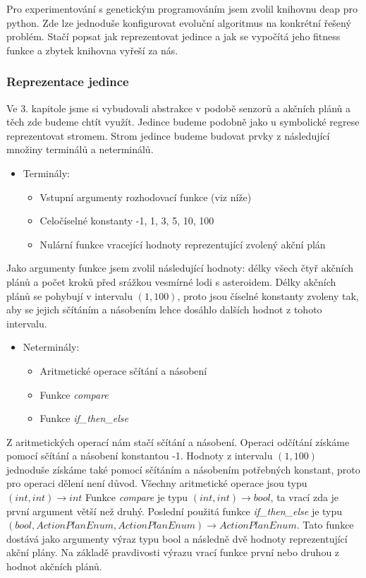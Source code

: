 Pro experimentování s genetickým programováním jsem zvolil knihovnu deap pro python. Zde lze jednoduše konfigurovat evoluční algoritmus na konkrétní řešený problém.
Stačí popsat jak reprezentovat jedince a jak se vypočítá jeho fitness funkce a zbytek knihovna vyřeší za nás.

\subsubsection{Reprezentace jedince}

Ve 3. kapitole jsme si vybudovali abstrakce v podobě senzorů a akčních plánů a těch zde budeme chtít využít.
Jedince budeme podobně jako u symbolické regrese reprezentovat stromem.
Strom jedince budeme budovat prvky z následující množiny terminálů a neterminálů.

\begin{itemize}
\item{
    Terminály:
    \begin{itemize}
        \item Vstupní argumenty rozhodovací funkce (viz níže)
        \item Celočíselné konstanty -1, 1, 3, 5, 10, 100
        \item Nulární funkce vracející hodnoty reprezentující zvolený akční plán  
    \end{itemize}    
    }    
\end{itemize}
Jako argumenty funkce jsem zvolil následující hodnoty: délky všech čtyř akčních plánů a počet kroků před srážkou vesmírné lodi s asteroidem.
    Délky akčních plánů se pohybují v intervalu $(1,100)$, proto jsou číselné konstanty zvoleny tak, aby se jejich sčítáním a násobením lehce dosáhlo dalších hodnot z tohoto intervalu.


\begin{itemize}

\item{
    Neterminály:
    \begin{itemize}
        \item Aritmetické operace sčítání a násobení
        \item Funkce \emph{compare}
        \item Funkce \emph{if\_then\_else}
    \end{itemize}
}
\end{itemize}
Z aritmetických operací nám stačí sčítání a násobení. Operaci odčítání získáme pomocí sčítání a násobení konstantou -1. 
Hodnoty z intervalu $(1,100)$ jednoduše získáme také pomocí sčítáním a násobením potřebných konstant, proto pro operaci dělení není důvod.
Všechny aritmetické operace jsou typu $(int, int) \rightarrow int$
Funkce \emph{compare} je typu $(int, int) \rightarrow bool$, ta vrací zda je první argument větší než druhý.
Poslední použitá funkce \emph{if\_then\_else} je typu 
\newline
$(bool, ActionPlanEnum, ActionPlanEnum)\rightarrow ActionPlanEnum$. 
Tato funkce dostává jako argumenty výraz typu bool a následně dvě hodnoty reprezentující akční plány. 
Na základě pravdivosti výrazu vrací funkce první nebo druhou z hodnot akčních plánů.

